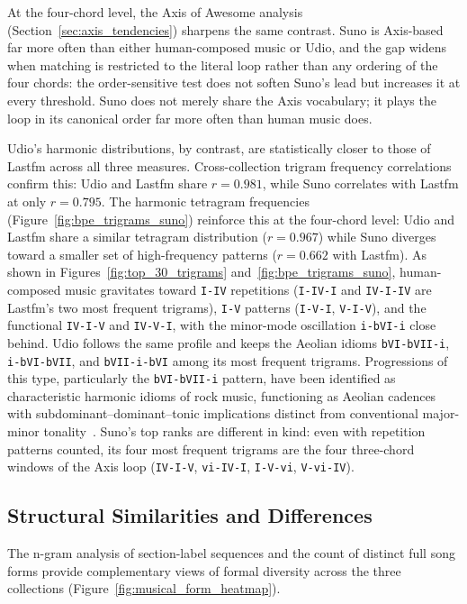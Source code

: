 \documentclass{article}
\begin{document}
At the four-chord level, the Axis of Awesome analysis (Section~\ref{sec:axis_tendencies}) sharpens the same contrast. Suno is Axis-based far more often than either human-composed music or Udio, and the gap widens when matching is restricted to the literal loop rather than any ordering of the four chords: the order-sensitive test does not soften Suno's lead but increases it at every threshold. Suno does not merely share the Axis vocabulary; it plays the loop in its canonical order far more often than human music does.

Udio's harmonic distributions, by contrast, are statistically closer to those of Lastfm across all three measures. Cross-collection trigram frequency correlations confirm this: Udio and Lastfm share $r = 0.981$, while Suno correlates with Lastfm at only $r = 0.795$. The harmonic tetragram frequencies (Figure~\ref{fig:bpe_trigrams_suno}) reinforce this at the four-chord level: Udio and Lastfm share a similar tetragram distribution ($r = 0.967$) while Suno diverges toward a smaller set of high-frequency patterns ($r = 0.662$ with Lastfm). As shown in Figures~\ref{fig:top_30_trigrams} and~\ref{fig:bpe_trigrams_suno}, human-composed music gravitates toward \texttt{I-IV} repetitions (\texttt{I-IV-I} and \texttt{IV-I-IV} are Lastfm's two most frequent trigrams), \texttt{I-V} patterns (\texttt{I-V-I}, \texttt{V-I-V}), and the functional \texttt{IV-I-V} and \texttt{IV-V-I}, with the minor-mode oscillation \texttt{i-bVI-i} close behind. Udio follows the same profile and keeps the Aeolian idioms \texttt{bVI-bVII-i}, \texttt{i-bVI-bVII}, and \texttt{bVII-i-bVI} among its most frequent trigrams. Progressions of this type, particularly the \texttt{bVI-bVII-i} pattern, have been identified as characteristic harmonic idioms of rock music, functioning as Aeolian cadences with subdominant--dominant--tonic implications distinct from conventional major-minor tonality~\citep{biamonte2010triadic}. Suno's top ranks are different in kind: even with repetition patterns counted, its four most frequent trigrams are the four three-chord windows of the Axis loop (\texttt{IV-I-V}, \texttt{vi-IV-I}, \texttt{I-V-vi}, \texttt{V-vi-IV}).

\subsection{Structural Similarities and Differences}
\label{sec:disc_structure}

The n-gram analysis of section-label sequences and the count of distinct full song forms provide complementary views of formal diversity across the three collections (Figure~\ref{fig:musical_form_heatmap}).
\end{document}
